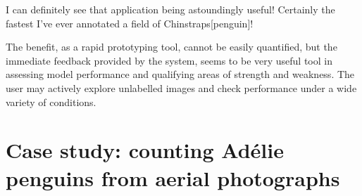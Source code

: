 \begin{displayquote}
I can definitely see that application being astoundingly useful! Certainly the fastest I've ever annotated a field of Chinstraps[penguin]! 
\end{displayquote}

The benefit, as a rapid prototyping tool, cannot be easily quantified, but the immediate feedback provided by the system, seems to be very useful tool in assessing model performance and qualifying areas of strength and weakness. The user may actively explore unlabelled images and check performance under a wide variety of conditions.


\section{Case study: counting Ad\'elie penguins from aerial photographs}
\label{sec:case_penguins}

